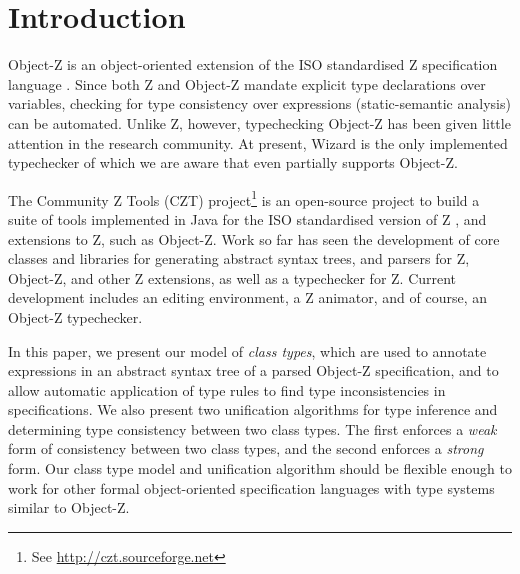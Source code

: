 \section{Introduction}

Object-Z \cite{smith00} is an object-oriented extension of the ISO
standardised Z specification language \cite{isoz}. Since both Z
and Object-Z mandate explicit type declarations over variables,
checking for type consistency over expressions (static-semantic
analysis) can be automated. Unlike Z, however, typechecking Object-Z
has been given little attention in the research community.  At
present, Wizard \cite{johnston96} is the only implemented typechecker
of which we are aware that even partially supports Object-Z.

The Community Z Tools (CZT) project\footnote{See
\url{http://czt.sourceforge.net}} is an open-source project to build a
suite of tools implemented in Java for the ISO standardised version of
Z \cite{isoz}, and extensions to Z, such as Object-Z. Work so far has
seen the development of core classes and libraries for generating
abstract syntax trees, and parsers for Z, Object-Z, and other Z
extensions, as well as a typechecker for Z. Current development
includes an editing environment, a Z animator, and of course, an
Object-Z typechecker.

In this paper, we present our model of {\em class types}, which are
used to annotate expressions in an abstract syntax tree of a parsed
Object-Z specification, and to allow automatic application of type
rules to find type inconsistencies in specifications. We also present
two unification algorithms for type inference and determining type
consistency between two class types. The first enforces a {\em weak}
form of consistency between two class types, and the second enforces a
{\em strong} form. Our class type model and unification algorithm
should be flexible enough to work for other formal object-oriented
specification languages with type systems similar to Object-Z.
